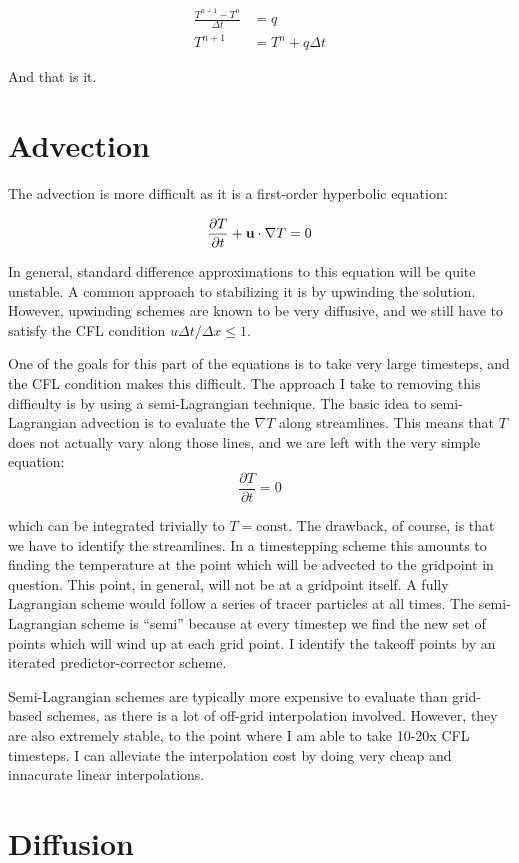 \documentclass[a4paper,10pt]{article}
\begin{document}
\begin{equation}
\begin{aligned}
\frac{ T^{n+1} - T^n}{\Delta t} &= q \\
T^{n+1} &= T^n + q \Delta t
\end{aligned}
\end{equation}

And that is it.

\section{Advection}

The advection is more difficult as it is a first-order hyperbolic equation:

\begin{equation}
\frac{\partial T}{\partial t} + {\bf u} \cdot \nabla T = 0
\end{equation}

In general, standard difference approximations to this equation will be quite unstable.
A common approach to stabilizing it is by upwinding the solution.  
However, upwinding schemes are known to be very diffusive, and we still have to satisfy the CFL condition $u \Delta t/\Delta x \le 1$.

One of the goals for this part of the equations is to take very large timesteps, and the CFL condition makes this difficult.
The approach I take to removing this difficulty is by using a semi-Lagrangian technique.
The basic idea to semi-Lagrangian advection is to evaluate the $\nabla T$ along streamlines.  
This means that $T$ does not actually vary along those lines, and we are left with the very simple equation:
\begin{equation}
\frac{\partial T}{\partial t} = 0
\end{equation}

which can be integrated trivially to $T=\mathrm{const}$.
The drawback, of course, is that we have to identify the streamlines.
In a timestepping scheme this amounts to finding the temperature at the point which will be advected to the gridpoint in question.
This point, in general, will not be at a gridpoint itself.
A fully Lagrangian scheme would follow a series of tracer particles at all times.  
The semi-Lagrangian scheme is ``semi'' because at every timestep we find the new set of points which will wind up at each grid point.
I identify the takeoff points by an iterated predictor-corrector scheme.

Semi-Lagrangian schemes are typically more expensive to evaluate than grid-based schemes, as there is a lot of off-grid interpolation involved.  
However, they are also extremely stable, to the point where I am able to take 10-20x CFL timesteps.
I can alleviate the interpolation cost by doing very cheap and innacurate linear interpolations.

\section{Diffusion}
\end{document}
